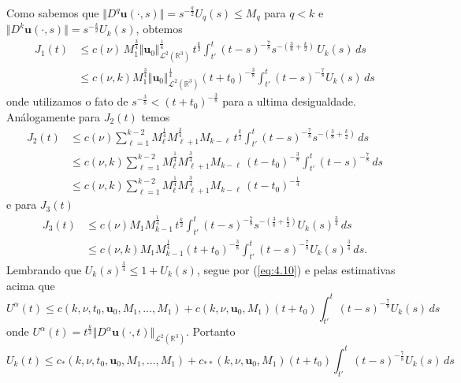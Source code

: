 \documentclass[a4paper, 11pt]{book}
\theoremstyle{definition}
\newcommand{\bR}{\mathbb{R}}
\newcommand{\bu}{\mathbf{u}}
\newcommand{\cL}{\mathcal{L}}
\begin{document}
\begin{prf}
\[    \]
    Como sabemos que $\Vert D^q \bu(\cdot,s) \Vert = s^{-\frac{q}{2}} U_q(s) \leqslant M_q$ para $q < k$ e $\Vert D^k\bu(\cdot,s) \Vert = s^{-\frac{k}{2}} U_k(s)$, obtemos
    \[
        \begin{aligned}
            J_1(t) &\leqslant c(\nu) \, M_1^{\frac{3}{4}} \Vert \bu_0 \Vert_{\cL^2(\bR^3)}^{\frac{1}{4}} \, t^{\frac{k}{2}} \int_{t'}^t (t - s)^{-\frac{7}{8}} s^{-\left( \frac{3}{8} + \frac{k}{2} \right)} \,U_k(s) \,ds\\
            &\leqslant c(\nu,k) M_1^{\frac{3}{4}} \Vert \bu_0 \Vert_{\cL^2(\bR^3)}^{\frac{1}{4}} (t + t_0)^{-\frac{3}{8}} \int_{t'}^t (t- s)^{-\frac{7}{8}} U_k(s) \,ds 
        \end{aligned}
    \]
    onde utilizamos o fato de $s^{-\frac{3}{8}} < ( t + t_0)^{-\frac{3}{8}}$ para a ultima desigualdade.
    Análogamente para $J_2(t)$ temos
    \[
        \begin{aligned}
            J_2(t) &\leqslant c(\nu) \sum_{\ell=1}^{k-2} M_{\ell}^{\frac{1}{4}} M_{\ell + 1}^{\frac{3}{4}} M_{k-\ell} \, t^{\frac{k}{2}} \int_{t'}^t (t - s)^{-\frac{7}{8}} s^{-\left( \frac{3}{8} + \frac{k}{2} \right)} \,ds\\
            &\leqslant c(\nu,k) \sum_{\ell=1}^{k-2} M_{\ell}^{\frac{1}{4}} M_{\ell + 1}^{\frac{3}{4}} M_{k-\ell} \, (t - t_0)^{-\frac{3}{8}} \int_{t'}^t (t - s)^{-\frac{7}{8}} \,ds\\
            &\leqslant c(\nu,k) \sum_{\ell=1}^{k-2} M_{\ell}^{\frac{1}{4}} M_{\ell + 1}^{\frac{3}{4}} M_{k-\ell} \, (t - t_0)^{-\frac{1}{4}}
        \end{aligned}
    \]
    e para $J_3(t)$
    \[
        \begin{aligned}
            J_3(t) &\leqslant c(\nu) M_1 M_{k-1}^{\frac{1}{4}} \, t^{\frac{k}{2}} \int_{t'}^{t} (t - s)^{-\frac{7}{8}} s^{-\left( \frac{3}{8} + \frac{k}{2} \right)} U_k(s)^{\frac{3}{4}} \,ds\\
            &\leqslant c(\nu,k) M_1 M_{k-1}^{\frac{1}{4}} (t + t_0)^{-\frac{3}{8}} \int_{t'}^t (t - s)^{-\frac{7}{8}} U_k(s)^{\frac{3}{4}}\,ds.
        \end{aligned}
    \]
    Lembrando que $U_k(s)^{\frac{3}{4}} \leqslant 1 + U_k(s)$, segue por (\ref{eq:4.10}) e pelas estimativas acima que
    \[
        U^\alpha(t) \leqslant c(k,\nu, t_0, \bu_0, M_1,\dots,M_1) + c(k,\nu,\bu_0, M_1) (t + t_0) \int_{t'}^t (t-s)^{-\frac{7}{8}} U_k(s)\,ds
    \]
    onde $U^\alpha(t) = t^{\frac{k}{2}} \Vert D^\alpha \bu(\cdot,t) \Vert_{\cL^2(\bR^3)}$.
    Portanto
    \[
        U_k(t) \leqslant c_*(k,\nu, t_0, \bu_0, M_1,\dots,M_1) + c_{**}(k,\nu,\bu_0, M_1) (t + t_0) \int_{t'}^t (t-s)^{-\frac{7}{8}} U_k(s)\,ds
\]
\end{prf}
\end{document}
